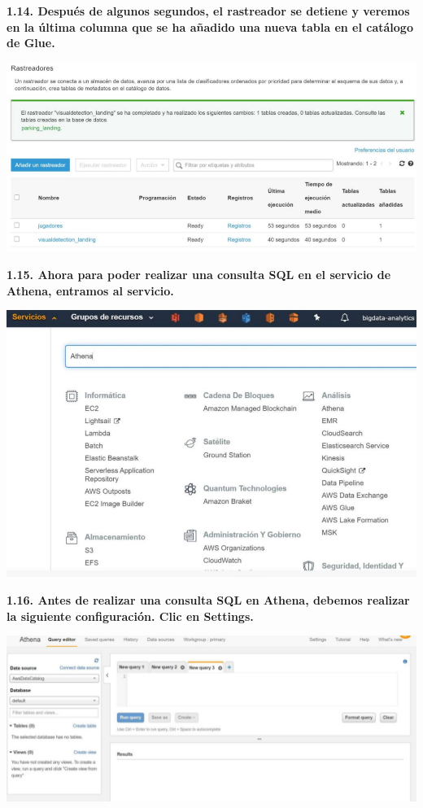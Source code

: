 \documentclass{article}
\begin{document}
	\textbf{1.14. Después de algunos segundos, el rastreador se detiene y veremos en la última columna que se ha
añadido una nueva tabla en el catálogo de Glue.
}

    \begin{center}
		\includegraphics[width=15cm]{./images/15} 
	\end{center}
	
	\textbf{1.15.  Ahora para poder realizar una consulta SQL en el servicio de Athena, entramos al servicio.
}

    \begin{center}
		\includegraphics[width=15cm]{./images/16} 
	\end{center}
	
	\textbf{1.16.  Antes de realizar una consulta SQL en Athena, debemos realizar la siguiente configuración.
Clic en Settings.
}

    \begin{center}
		\includegraphics[width=15cm]{./images/17} 
	\end{center}
	
\end{document}
